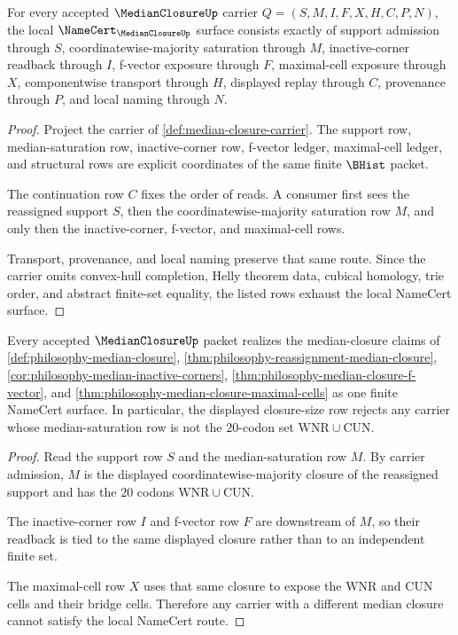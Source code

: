 \begin{theorem}
\label{thm:median-closure-namecert-obligations}
For every accepted $\MedianClosureUp$ carrier $Q=(S,M,I,F,X,H,C,P,N)$, the local $\NameCert_{\MedianClosureUp}$ surface consists exactly of support admission through $S$, coordinatewise-majority saturation through $M$, inactive-corner readback through $I$, f-vector exposure through $F$, maximal-cell exposure through $X$, componentwise transport through $H$, displayed replay through $C$, provenance through $P$, and local naming through $N$.
\end{theorem}
\begin{proof}
Project the carrier of \autoref{def:median-closure-carrier}. The support row, median-saturation row, inactive-corner row, f-vector ledger, maximal-cell ledger, and structural rows are explicit coordinates of the same finite $\BHist$ packet.

The continuation row $C$ fixes the order of reads. A consumer first sees the reassigned support $S$, then the coordinatewise-majority saturation row $M$, and only then the inactive-corner, f-vector, and maximal-cell rows.

Transport, provenance, and local naming preserve that same route. Since the carrier omits convex-hull completion, Helly theorem data, cubical homology, trie order, and abstract finite-set equality, the listed rows exhaust the local NameCert surface.
\end{proof}

\begin{theorem}
\label{thm:median-closure-vision-realization}
Every accepted $\MedianClosureUp$ packet realizes the median-closure claims of \autoref{def:philosophy-median-closure}, \autoref{thm:philosophy-reassignment-median-closure}, \autoref{cor:philosophy-median-inactive-corners}, \autoref{thm:philosophy-median-closure-f-vector}, and \autoref{thm:philosophy-median-closure-maximal-cells} as one finite NameCert surface. In particular, the displayed closure-size row rejects any carrier whose median-saturation row is not the $20$-codon set $\mathrm{WNR}\cup\mathrm{CUN}$.
\end{theorem}
\begin{proof}
Read the support row $S$ and the median-saturation row $M$. By carrier admission, $M$ is the displayed coordinatewise-majority closure of the reassigned support and has the $20$ codons $\mathrm{WNR}\cup\mathrm{CUN}$.

The inactive-corner row $I$ and f-vector row $F$ are downstream of $M$, so their readback is tied to the same displayed closure rather than to an independent finite set.

The maximal-cell row $X$ uses that same closure to expose the $\mathrm{WNR}$ and $\mathrm{CUN}$ cells and their bridge cells. Therefore any carrier with a different median closure cannot satisfy the local NameCert route.
\end{proof}

